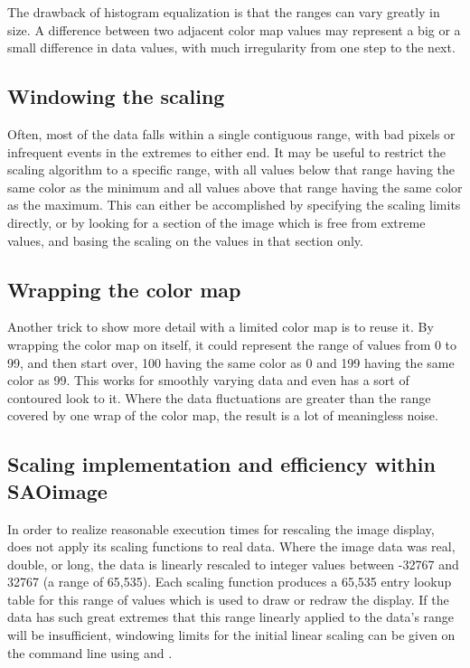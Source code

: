 The drawback of histogram equalization is that the ranges can vary
greatly in size.  A difference between two adjacent color map values
may represent a big or a small difference in data values, with much
irregularity from one step to the next.

\subsection{ Windowing the scaling }

Often, most of the data falls within a single contiguous range, with bad
pixels or infrequent events in the extremes to either end.  It may be
useful to restrict the scaling algorithm to a specific range, with
all values below that range having the same color as the minimum and
all values above that range having the same color as the maximum.
This can either be accomplished by specifying the scaling limits
directly, or by looking for a section of the image which is free from
extreme values, and basing the scaling on the values in that section
only.

\subsection{ Wrapping the color map }

Another trick to show more detail with a limited color map is to reuse
it.  By wrapping the color map on itself, it could represent the range
of values from 0 to 99, and then start over, 100 having the same color
as 0 and 199 having the same color as 99.  This works for smoothly
varying data and even has a sort of contoured look to it.  Where the
data fluctuations are greater than the range covered by one wrap of
the color map, the result is a lot of meaningless noise.

\subsection{ Scaling implementation and efficiency within SAOimage }
\label{scaleopt-sec}

In order to realize reasonable execution times for rescaling the image
display, {\SAO} does not apply its scaling functions to real
data.  Where the image data was real, double, or long, the data is
linearly rescaled to integer values between -32767 and 32767 (a range
of 65,535).  Each scaling function produces a 65,535 entry lookup
table for this range of values which is used to draw or redraw the
display.  If the data has such great extremes that this range linearly
applied to the data's range will be insufficient, windowing limits for
the initial linear scaling can be given on the command line using
 and .

